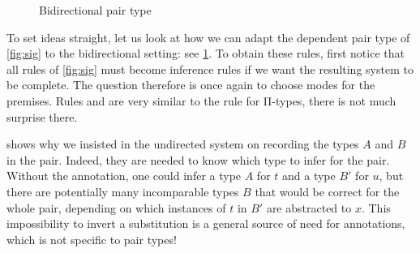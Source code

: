 \begin{figure}
    

  \caption{Bidirectional pair type}
  \label{fig:bidir-pair}
\end{figure}

To set ideas straight, let us look at how we can adapt the dependent pair type of
\cref{fig:sig} to the bidirectional setting: see \cref{fig:bidir-pair}.
To obtain these rules, first notice that all rules of \cref{fig:sig}
must become inference rules if we want the resulting system to be complete.
The question therefore is once again to choose modes for the premises.
Rules  and  are
very similar to the rule for Π-types, there is not much surprise there.

 shows why we insisted in the undirected system
on recording the types $A$ and $B$ in the pair. Indeed, they are needed to
know which type to infer for the pair. Without the annotation, one could infer a
type $A$ for $t$ and a type $B'$ for $u$, but there are potentially many incomparable types $B$ that would be correct for the whole pair, depending on which instances of $t$ in $B'$ are abstracted to $x$. This impossibility to invert a substitution is a general source of need
for annotations, which is not specific to pair types!

